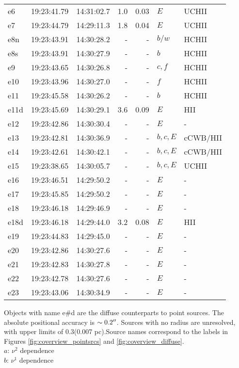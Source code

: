 \begin{table*}[htp]
\begin{tabular}{lllrrll}
e6 & 19:23:41.79 & 14:31:02.7 & 1.0 & 0.03 & $E$ & UCHII \\
e7 & 19:23:44.79 & 14:29:11.3 & 1.8 & 0.04 & $E$ & UCHII \\
e8n & 19:23:43.91 & 14:30:28.2 & - & - & $b/w$ & HCHII \\
e8s & 19:23:43.91 & 14:30:27.9 & - & - & $b$ & HCHII \\
e9 & 19:23:43.65 & 14:30:26.8 & - & - & $c,f$ & HCHII \\
e10 & 19:23:43.96 & 14:30:27.0 & - & - & $f$ & HCHII \\
e11 & 19:23:45.58 & 14:30:26.2 & - & - & $b$ & HCHII \\
e11d & 19:23:45.69 & 14:30:29.1 & 3.6 & 0.09 & $E$ & HII \\
e12 & 19:23:42.86 & 14:30:30.4 & - & - & $E$ & - \\
e13 & 19:23:42.81 & 14:30:36.9 & - & - & $b,c,E$ & cCWB/HII \\
e14 & 19:23:42.61 & 14:30:42.1 & - & - & $b,c,E$ & cCWB/HII \\
e15 & 19:23:38.65 & 14:30:05.7 & - & - & $b,c,E$ & UCHII \\
e16 & 19:23:46.51 & 14:29:50.2 & - & - & $E$ & - \\
e17 & 19:23:45.85 & 14:29:50.2 & - & - & $E$ & - \\
e18 & 19:23:46.18 & 14:29:46.9 & - & - & $E$ & - \\
e18d & 19:23:46.18 & 14:29:44.0 & 3.2 & 0.08 & $E$ & HII \\
e19 & 19:23:44.83 & 14:29:45.0 & - & - & $E$ & - \\
e20 & 19:23:42.86 & 14:30:27.6 & - & - & $E$ & - \\
e21 & 19:23:42.83 & 14:30:27.8 & - & - & $E$ & - \\
e22 & 19:23:42.78 & 14:30:27.6 & - & - & $E$ & - \\
e23 & 19:23:43.06 & 14:30:34.9 & - & - & $E$ & - \\
\hline
\end{tabular}
\par
Objects with name e\#d are the diffuse counterparts to point sources.  The absolute positional accuracy is $\sim0.2\mbox{$^{\prime\prime}$}$.  Sources with no radius are unresolved, with upper limits of 0.3\arcsec (0.007 pc).Source names correspond to the labels in Figures \ref{fig:coverview_pointsrcs} and \ref{fig:coverview_diffuse}.\\
$a$: $\nu^2$ dependence \\
$b$: $\nu^1$ dependence \\

\end{table*}
